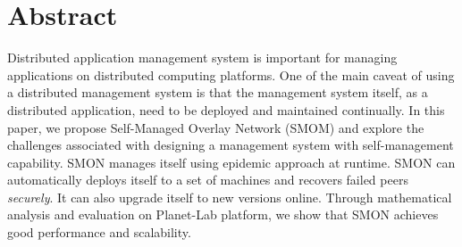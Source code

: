 \section*{Abstract}

Distributed application management system is important for
managing applications on distributed computing platforms.
One of the main caveat of using a distributed management
system is that the management system itself, as a
distributed application, need to be deployed and maintained
continually.  In this paper, we propose Self-Managed Overlay
Network (SMOM) and explore the challenges associated with
designing a management system with self-management
capability. SMON manages itself using epidemic approach at
runtime. SMON can automatically deploys itself to a set of
machines and recovers failed peers \emph{securely}. It can
also upgrade itself to new versions online. Through
mathematical analysis and evaluation on Planet-Lab platform,
we show that SMON achieves good performance and scalability.

